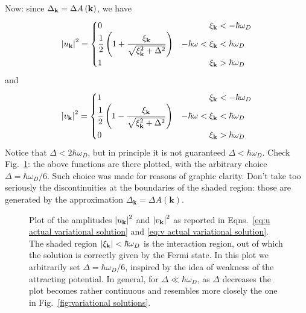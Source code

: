 Now: since $\Delta_\mathbf{k} = \Delta A\left({\mathbf{k}}\right)$, we have
\begin{equation}\label{eq:u actual variational solution}
	\abs{u_\mathbf{k}}^2 = \begin{cases}
		0 &\hphantom{-\hbar\omega <{}}\xi_\mathbf{k} < -\hbar\omega_D\\
		\displaystyle\frac{1}{2} \lrR{1 + \frac{\xi_\mathbf{k}}{\sqrt{\xi_\mathbf{k}^2 + \Delta^2}}} &-\hbar\omega <\xi_\mathbf{k} < \hbar\omega_D\\
		1 &\hphantom{-\hbar\omega <{}}\xi_\mathbf{k} > \hbar\omega_D
	\end{cases}
\end{equation}
and
\begin{equation}\label{eq:v actual variational solution}
	\abs{v_\mathbf{k}}^2 = \begin{cases}
		1 &\hphantom{-\hbar\omega <{}}\xi_\mathbf{k} < -\hbar\omega_D\\
		\displaystyle\frac{1}{2} \lrR{1 - \frac{\xi_\mathbf{k}}{\sqrt{\xi_\mathbf{k}^2 + \Delta^2}}} &-\hbar\omega <\xi_\mathbf{k} < \hbar\omega_D\\
		0 &\hphantom{-\hbar\omega <{}}\xi_\mathbf{k} > \hbar\omega_D
	\end{cases}
\end{equation}
Notice that $\Delta < 2\hbar\omega_D$, but in principle it is not guaranteed $\Delta < \hbar\omega_D$. Check Fig.~\ref{fig:actual variational solutions}: the above functions are there plotted, with the arbitrary choice $\Delta = \hbar\omega_D/6$. Such choice was made for reasons of graphic clarity. Don't take too seriously the discontinuities at the boundaries of the shaded region: those are generated by the approximation $\Delta_\mathbf{k} = \Delta A(\mathbf{k})$.

\begin{figure}
	\centering
	
	\caption{Plot of the amplitudes $\abs{u_\mathbf{k}}^2$ and $\abs{v_\mathbf{k}}^2$ as reported in Eqns.~\eqref{eq:u actual variational solution} and \eqref{eq:v actual variational solution}. The shaded region $\abs{\xi_\mathbf{k}} < \hbar\omega_D$ is the interaction region, out of which the solution is correctly given by the Fermi state. In this plot we arbitrarily set $\Delta = \hbar\omega_D/6$, inspired by the idea of weakness of the attracting potential. In general, for $\Delta \ll \hbar\omega_D$, as $\Delta$ decreases the plot becomes rather continuous and resembles more closely the one in Fig.~\ref{fig:variational solutions}.}
	\label{fig:actual variational solutions}
\end{figure}

